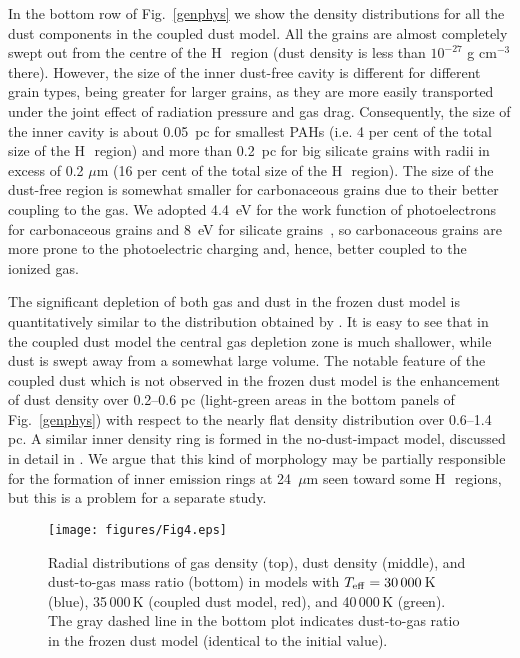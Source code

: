 \documentclass[a4paper,fleqn,usenatbib]{mnras}
\newcommand{\hii}    {H\,{\sc{ii}}~}
\begin{document}
In the bottom row of Fig.~\ref{genphys} we show the density distributions for all the dust components in the coupled dust model. All the grains are almost completely swept out from the centre of the \hii region (dust density is less than $10^{-27}$ g cm$^{-3}$ there). However, the size of the inner dust-free cavity is different for different grain types, being greater for larger grains, as they are more easily transported under the joint effect of radiation pressure and gas drag. Consequently, the size of the inner cavity is about 0.05~pc for smallest PAHs (i.e. 4 per cent of the total size of the \hii region) and more than 0.2~pc for big silicate grains with radii in excess of 0.2 $\mu$m (16 per cent of the total size of the \hii region). The size of the dust-free region is somewhat smaller for carbonaceous grains due to their better coupling to the gas. We adopted 4.4~eV for the work function of photoelectrons for carbonaceous grains and 8~eV for silicate grains~\citep{2001ApJS..134..263W}, so carbonaceous grains are more prone to the photoelectric charging and, hence, better coupled to the ionized gas.

The significant depletion of both gas and dust in the frozen dust  model is quantitatively similar to the distribution obtained by \cite{Rodr}. It is easy to see that in the coupled dust model the central gas depletion zone is much shallower, while dust is swept away from a somewhat large volume. The notable feature of the coupled dust  which is not observed in the frozen dust model is the enhancement of dust density over 0.2--0.6 pc (light-green areas in the bottom panels of Fig.~\ref{genphys}) with respect to the nearly flat density distribution over 0.6--1.4 pc. A similar inner density ring is formed in the no-dust-impact model, discussed in detail in . We argue that this kind of morphology may be partially responsible for the formation of inner emission rings at 24~$\mu$m seen toward some \hii regions, but this is a problem for a separate study.

\begin{figure}
\centering
\texttt{[image: figures/Fig4.eps]}
\caption{Radial distributions of gas density (top), dust density (middle), and dust-to-gas mass ratio (bottom) in models with $T_{\rm eff}=30\,000$\,K (blue), 35\,000\,K (coupled dust model, red), and 40\,000\,K (green). The gray dashed line in the bottom plot indicates dust-to-gas ratio in the frozen dust model (identical to the initial value).}
\label{dust-gas-stars}
\end{figure}
\end{document}
